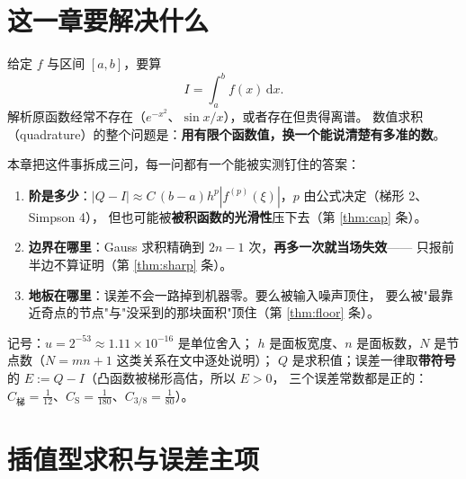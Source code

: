 

\section{这一章要解决什么}

给定 $f$ 与区间 $[a,b]$，要算
\[
  I=\int_a^b f(x)\,\mathrm{d}x .
\]
解析原函数经常不存在（$e^{-x^2}$、$\sin x/x$），或者存在但贵得离谱。
数值求积（quadrature）的整个问题是：\textbf{用有限个函数值，换一个能说清楚有多准的数}。

本章把这件事拆成三问，每一问都有一个能被实测钉住的答案：

\begin{enumerate}
  \item \textbf{阶是多少}：$|Q-I|\approx C\,(b-a)h^p|f^{(p)}(\xi)|$，$p$ 由公式决定（梯形 2、Simpson 4），
        但也可能被\textbf{被积函数的光滑性}压下去（第 \ref{thm:cap} 条）。
  \item \textbf{边界在哪里}：Gauss 求积精确到 $2n-1$ 次，\textbf{再多一次就当场失效}——
        只报前半边不算证明（第 \ref{thm:sharp} 条）。
  \item \textbf{地板在哪里}：误差不会一路掉到机器零。要么被输入噪声顶住，
        要么被"最靠近奇点的节点"与"没采到的那块面积"顶住（第 \ref{thm:floor} 条）。
\end{enumerate}

记号：$u=2^{-53}\approx1.11\times10^{-16}$ 是单位舍入；
$h$ 是面板宽度、$n$ 是面板数，$N$ 是节点数（$N=mn+1$ 这类关系在文中逐处说明）；
$Q$ 是求积值；误差一律取\textbf{带符号}的 $E:=Q-I$（凸函数被梯形高估，所以 $E>0$，
三个误差常数都是正的：$C_{\text{梯}}=\tfrac1{12}$、$C_{\text{S}}=\tfrac1{180}$、$C_{3/8}=\tfrac1{80}$）。

\section{插值型求积与误差主项}

